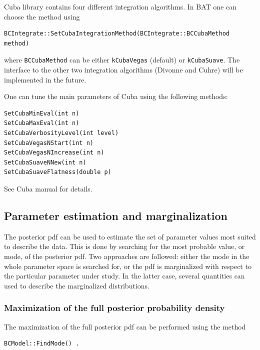 \documentclass[11pt, a4paper]{article}
\begin{document}
Cuba library contains four different integration algorithms. In BAT
one can choose the method using
%
\begin{verbatim}
BCIntegrate::SetCubaIntegrationMethod(BCIntegrate::BCCubaMethod method)
\end{verbatim}
%
where \verb|BCCubaMethod| can be either \verb|kCubaVegas| (default)
or \verb|kCubaSuave|. The interface to the other two integration
algorithms (Divonne and Cuhre) will be implemented in the future.

\noindent
One can tune the main parameters of Cuba using the following methods:
%
\begin{verbatim}
SetCubaMinEval(int n)
SetCubaMaxEval(int n)
SetCubaVerbosityLevel(int level)
SetCubaVegasNStart(int n)
SetCubaVegasNIncrease(int n)
SetCubaSuaveNNew(int n)
SetCubaSuaveFlatness(double p)
\end{verbatim}
%
See Cuba manual for details.


\subsection{Parameter estimation and marginalization}

The posterior pdf can be used to estimate the set of parameter values
most suited to describe the data. This is done by searching for the
most probable value, or mode, of the posterior pdf. Two approaches are
followed: either the mode in the whole parameter space is searched
for, or the pdf is marginalized with respect to the particular
parameter under study. In the latter case, several quantities can used
to describe the marginalized distributions.


\subsubsection{Maximization of the full posterior probability density}

The maximization of the full posterior pdf can be performed using the
method
%
\begin{verbatim}
BCModel::FindMode() .
\end{verbatim}
\end{document}
